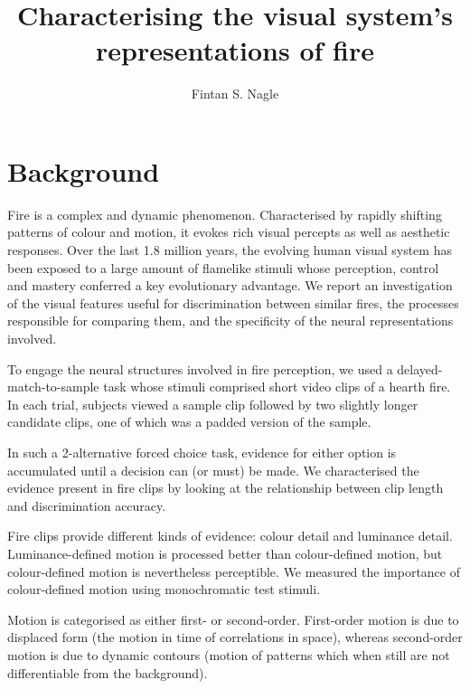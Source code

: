 \documentclass[a4paper]{article}
\title{Characterising the visual system's representations of fire}
\author{Fintan S. Nagle}
\begin{document}
\maketitle


\section{Background}

Fire is a complex and dynamic phenomenon. Characterised by rapidly shifting patterns of colour and motion, it evokes rich visual percepts as well as aesthetic responses. Over the last 1.8 million years, the evolving human visual system has been exposed to a large amount of flamelike stimuli \cite{ bowman2009fire}whose perception, control and mastery conferred a key evolutionary advantage\cite{ bowman2009fire}.  We report an investigation of the visual features useful for discrimination between similar fires, the processes responsible for comparing them, and the specificity of the neural representations involved.



To engage the neural structures involved in fire perception, we used a delayed-match-to-sample task whose stimuli comprised short video clips of a hearth fire. In each trial, subjects viewed a sample clip followed by two slightly longer candidate clips, one of which was a padded version of the sample.

In such a 2-alternative forced choice task, evidence for either option is accumulated until a decision can (or must) be made\cite{bogacz2006physics}. We characterised the evidence present in fire clips by looking at the relationship between clip length and discrimination accuracy.

Fire clips provide different kinds of evidence: colour detail and luminance detail. Luminance-defined motion is processed better than colour-defined motion\cite{ramachandran1978does,cavanagh1984perceived,cabanagh1991contribution,mullen1992absence}, but colour-defined motion is nevertheless perceptible\cite{cropper1996rapid}. We measured the importance of colour-defined motion using monochromatic test stimuli.


Motion is categorised as either first- or second-order\cite{cavanagh1989motion,ledgeway1994evidence}. First-order motion is due to displaced form (the motion in time of correlations in space), whereas second-order motion is due to dynamic contours (motion of patterns which when still are not differentiable from the background).
\end{document}
